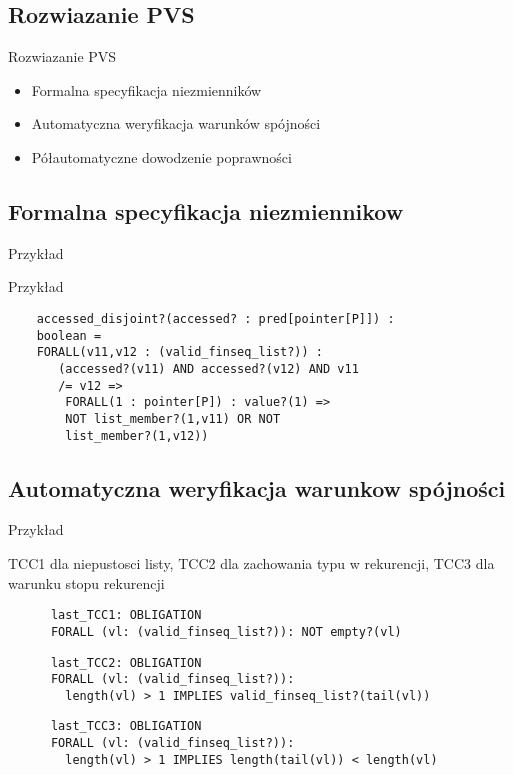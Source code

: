 \documentclass{beamer}
\begin{document}
\subsection{Rozwiazanie PVS}
\begin{frame}{Rozwiazanie PVS}

    \begin{itemize}
      \item Formalna specyfikacja niezmienników
      \item Automatyczna weryfikacja warunków spójności
      \item Półautomatyczne dowodzenie poprawności
    \end{itemize}
\end{frame}

\subsection{Formalna specyfikacja niezmiennikow}
\begin{frame}[fragile]{Przykład}
  \begin{exampleblock}{Przykład}
    
  \begin{verbatim}
    accessed_disjoint?(accessed? : pred[pointer[P]]) : 
    boolean =
    FORALL(v11,v12 : (valid_finseq_list?)) :
       (accessed?(v11) AND accessed?(v12) AND v11 
       /= v12 =>
        FORALL(1 : pointer[P]) : value?(1) =>
        NOT list_member?(1,v11) OR NOT 
        list_member?(1,v12))
    \end{verbatim}
  \end{exampleblock}

\end{frame}

\subsection{Automatyczna weryfikacja warunkow spójności}

\begin{frame}[fragile]{Przykład}
  \begin{exampleblock}{TCC1 dla niepustosci listy, TCC2 dla zachowania typu w rekurencji, TCC3 dla warunku stopu rekurencji}
 
    \begin{verbatim}
      last_TCC1: OBLIGATION 
      FORALL (vl: (valid_finseq_list?)): NOT empty?(vl)
    \end{verbatim}

    \begin{verbatim}
      last_TCC2: OBLIGATION 
      FORALL (vl: (valid_finseq_list?)): 
        length(vl) > 1 IMPLIES valid_finseq_list?(tail(vl))
    \end{verbatim}

    \begin{verbatim}
      last_TCC3: OBLIGATION 
      FORALL (vl: (valid_finseq_list?)): 
        length(vl) > 1 IMPLIES length(tail(vl)) < length(vl)
    \end{verbatim}
  \end{exampleblock}
    
\end{frame}
\end{document}
